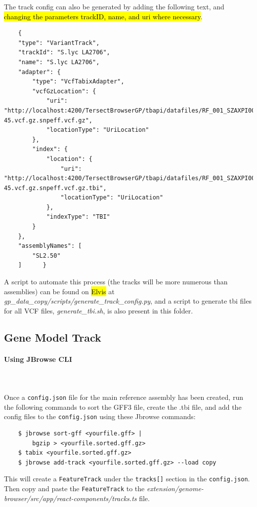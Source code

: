 \documentclass[12pt]{article}
\begin{document}
The track config can also be generated by adding the following text, and \hl{changing the parameters trackID, name, and uri where necessary}. 

\begin{lstlisting}
    { 
    "type": "VariantTrack", 
    "trackId": "S.lyc LA2706", 
    "name": "S.lyc LA2706", 
    "adapter": { 
        "type": "VcfTabixAdapter", 
        "vcfGzLocation": { 
            "uri": "http://localhost:4200/TersectBrowserGP/tbapi/datafiles/RF_001_SZAXPI008746-45.vcf.gz.snpeff.vcf.gz", 
            "locationType": "UriLocation" 
        }, 
        "index": { 
            "location": { 
                "uri": "http://localhost:4200/TersectBrowserGP/tbapi/datafiles/RF_001_SZAXPI008746-45.vcf.gz.snpeff.vcf.gz.tbi", 
                "locationType": "UriLocation" 
            }, 
            "indexType": "TBI" 
        } 
    }, 
    "assemblyNames": [ 
        "SL2.50" 
    ]      } 
\end{lstlisting}

A script to automate this process (the tracks will be more numerous than assemblies) can be found on \hl{Elvis} at \textit{gp\_data\_copy/scripts/generate\_track\_config.py}, and  a script to generate tbi files for all VCF files, \textit{generate\_tbi.sh}, is also present in this folder. 

\subsection{Gene Model Track}
\paragraph{Using JBrowse CLI}\mbox{}
\\\\
Once a \verb+config.json+ file for the main reference assembly has been created, run the following commands to sort the GFF3 file, create the .tbi file, and add the config files to the \verb+config.json+ using these Jbrowse commands:
\lstset{
  language=bash,
  basicstyle=\ttfamily
}
\begin{lstlisting}
    $ jbrowse sort-gff <yourfile.gff> | 
        bgzip > <yourfile.sorted.gff.gz>
    $ tabix <yourfile.sorted.gff.gz>
    $ jbrowse add-track <yourfile.sorted.gff.gz> --load copy
\end{lstlisting}
This will create a \verb+FeatureTrack+ under the \verb+tracks[]+ section in the \verb+config.json+. Then copy and paste the \verb+FeatureTrack+ to the \textit{extension/genome-browser/src/app/react-components/tracks.ts} file.
\end{document}
